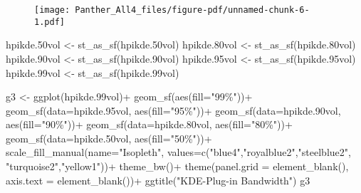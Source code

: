 \documentclass[
  letterpaper,
]{book}
\newenvironment{Shaded}{\begin{snugshade}}{\end{snugshade}}
\newcommand{\AttributeTok}[1]{\textcolor[rgb]{0.40,0.45,0.13}{#1}}
\newcommand{\FloatTok}[1]{\textcolor[rgb]{0.68,0.00,0.00}{#1}}
\newcommand{\FunctionTok}[1]{\textcolor[rgb]{0.28,0.35,0.67}{#1}}
\newcommand{\NormalTok}[1]{\textcolor[rgb]{0.00,0.23,0.31}{#1}}
\newcommand{\OtherTok}[1]{\textcolor[rgb]{0.00,0.23,0.31}{#1}}
\newcommand{\SpecialCharTok}[1]{\textcolor[rgb]{0.37,0.37,0.37}{#1}}
\newcommand{\StringTok}[1]{\textcolor[rgb]{0.13,0.47,0.30}{#1}}
\begin{document}
\begin{figure}[H]

{\centering \texttt{[image: Panther\_All4\_files/figure-pdf/unnamed-chunk-6-1.pdf]}

}

\end{figure}

\begin{Shaded}
\begin{Highlighting}[]
\NormalTok{hpikde}\FloatTok{.50}\NormalTok{vol }\OtherTok{\textless{}{-}} \FunctionTok{st\_as\_sf}\NormalTok{(hpikde}\FloatTok{.50}\NormalTok{vol)}
\NormalTok{hpikde}\FloatTok{.80}\NormalTok{vol }\OtherTok{\textless{}{-}} \FunctionTok{st\_as\_sf}\NormalTok{(hpikde}\FloatTok{.80}\NormalTok{vol)}
\NormalTok{hpikde}\FloatTok{.90}\NormalTok{vol }\OtherTok{\textless{}{-}} \FunctionTok{st\_as\_sf}\NormalTok{(hpikde}\FloatTok{.90}\NormalTok{vol)}
\NormalTok{hpikde}\FloatTok{.95}\NormalTok{vol }\OtherTok{\textless{}{-}} \FunctionTok{st\_as\_sf}\NormalTok{(hpikde}\FloatTok{.95}\NormalTok{vol)}
\NormalTok{hpikde}\FloatTok{.99}\NormalTok{vol }\OtherTok{\textless{}{-}} \FunctionTok{st\_as\_sf}\NormalTok{(hpikde}\FloatTok{.99}\NormalTok{vol)}

\NormalTok{g3 }\OtherTok{\textless{}{-}} \FunctionTok{ggplot}\NormalTok{(hpikde}\FloatTok{.99}\NormalTok{vol)}\SpecialCharTok{+}
  \FunctionTok{geom\_sf}\NormalTok{(}\FunctionTok{aes}\NormalTok{(}\AttributeTok{fill=}\StringTok{"99\%"}\NormalTok{))}\SpecialCharTok{+}
  \FunctionTok{geom\_sf}\NormalTok{(}\AttributeTok{data=}\NormalTok{hpikde}\FloatTok{.95}\NormalTok{vol, }\FunctionTok{aes}\NormalTok{(}\AttributeTok{fill=}\StringTok{"95\%"}\NormalTok{))}\SpecialCharTok{+} 
  \FunctionTok{geom\_sf}\NormalTok{(}\AttributeTok{data=}\NormalTok{hpikde}\FloatTok{.90}\NormalTok{vol, }\FunctionTok{aes}\NormalTok{(}\AttributeTok{fill=}\StringTok{"90\%"}\NormalTok{))}\SpecialCharTok{+}
  \FunctionTok{geom\_sf}\NormalTok{(}\AttributeTok{data=}\NormalTok{hpikde}\FloatTok{.80}\NormalTok{vol, }\FunctionTok{aes}\NormalTok{(}\AttributeTok{fill=}\StringTok{"80\%"}\NormalTok{))}\SpecialCharTok{+}
  \FunctionTok{geom\_sf}\NormalTok{(}\AttributeTok{data=}\NormalTok{hpikde}\FloatTok{.50}\NormalTok{vol, }\FunctionTok{aes}\NormalTok{(}\AttributeTok{fill=}\StringTok{"50\%"}\NormalTok{))}\SpecialCharTok{+}
  \FunctionTok{scale\_fill\_manual}\NormalTok{(}\AttributeTok{name=}\StringTok{"Isopleth"}\NormalTok{, }\AttributeTok{values=}\FunctionTok{c}\NormalTok{(}\StringTok{"blue4"}\NormalTok{,}\StringTok{"royalblue2"}\NormalTok{,}\StringTok{"steelblue2"}\NormalTok{, }\StringTok{"turquoise2"}\NormalTok{,}\StringTok{"yellow1"}\NormalTok{))}\SpecialCharTok{+}
  \FunctionTok{theme\_bw}\NormalTok{()}\SpecialCharTok{+}
  \FunctionTok{theme}\NormalTok{(}\AttributeTok{panel.grid =} \FunctionTok{element\_blank}\NormalTok{(), }\AttributeTok{axis.text =} \FunctionTok{element\_blank}\NormalTok{())}\SpecialCharTok{+}
  \FunctionTok{ggtitle}\NormalTok{(}\StringTok{"KDE{-}Plug{-}in Bandwidth"}\NormalTok{)}
\NormalTok{g3}
\end{Highlighting}
\end{Shaded}
\end{document}
